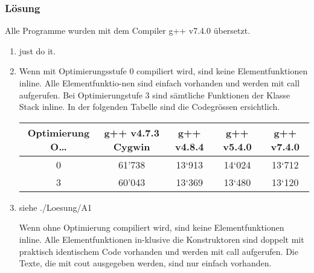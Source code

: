 \subsubsection{Lösung}
Alle Programme wurden mit dem Compiler g++ v7.4.0 übersetzt.
\begin{enumerate}
  \item just do it.
\item  Wenn mit Optimierungsstufe 0 compiliert wird, sind keine Elementfunktionen inline. Alle Elementfunktio-nen sind einfach vorhanden und werden mit call aufgerufen. Bei Optimierungstufe 3 sind sämtliche Funktionen der Klasse Stack inline.
In der folgenden Tabelle sind die Codegrössen ersichtlich.
\begin{center}
  \begin{tabular}{c c c c c}
    \hline
    \hline
    Optimierung O… & g++ v4.7.3 Cygwin & g++ v4.8.4  & g++ v5.4.0 & g++ v7.4.0 \\
    \hline
    0 &
    61'738&
    13‘913&
    14‘024&
    13‘712\\
    3&
    60'043&
    13‘369&
    13‘480&
    13‘120\\
    \hline
    \hline
  \end{tabular}
\end{center}

\item siehe ./Loesung/A1


\noindent\makebox[\linewidth]{\rule{\paperwidth}{0.4pt}}

\noindent\makebox[\linewidth]{\rule{\paperwidth}{0.4pt}}

\noindent\makebox[\linewidth]{\rule{\paperwidth}{0.4pt}}

\noindent\makebox[\linewidth]{\rule{\paperwidth}{0.4pt}}

\noindent\makebox[\linewidth]{\rule{\paperwidth}{0.4pt}}



Wenn ohne Optimierung compiliert wird, sind keine Elementfunktionen inline. Alle Elementfunktionen in-klusive die Konstruktoren sind doppelt mit praktisch identischem Code vorhanden und werden mit call aufgerufen. Die Texte, die mit cout ausgegeben werden, sind nur einfach vorhanden.


\end{enumerate}
